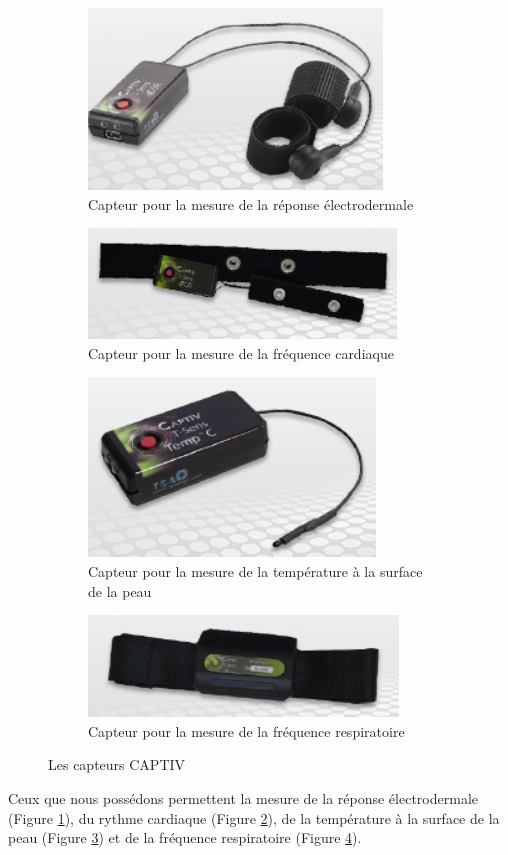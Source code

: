 \documentclass[11pt]{article}
\begin{document}
			\begin{figure}
				\begin{subfigure}{0.5\textwidth}
					\centering
					\includegraphics[scale=0.5]{../include/TEAgsr.PNG}
					\caption{Capteur pour la mesure de la réponse électrodermale}
					\label{fig:gsr}
				\end{subfigure}
				\begin{subfigure}{0.5\textwidth}
					\centering
					\includegraphics[scale=0.5]{../include/TEAhr.PNG}
					\caption{Capteur pour la mesure de la fréquence cardiaque}
					\label{fig:hr}
				\end{subfigure}\newline
				\begin{subfigure}{0.5\textwidth}
					\centering
					\includegraphics[scale=0.5]{../include/TEAbt.PNG}
					\caption{Capteur pour la mesure de la température à la surface de la peau}
					\label{fig:bt}
				\end{subfigure}
				\begin{subfigure}{0.5\textwidth}
					\centering
					\includegraphics[scale=0.5]{../include/TEArr.PNG}
					\caption{Capteur pour la mesure de la fréquence respiratoire}
					\label{fig:rr}
				\end{subfigure}
				\caption{Les capteurs CAPTIV}
				\label{fig:capteurstea}
			\end{figure}
			Ceux que nous possédons permettent la mesure de la réponse électrodermale (Figure \ref{fig:gsr}), du rythme cardiaque (Figure \ref{fig:hr}), de la température à la surface de la peau (Figure \ref{fig:bt}) et de la fréquence respiratoire (Figure \ref{fig:rr}).
\end{document}
